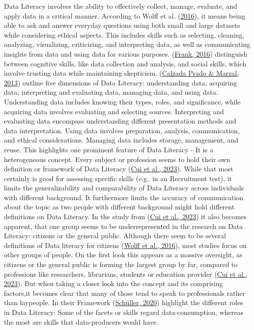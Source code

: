 \documentclass[
  12pt,
  a4paper,
  twoside]{article}
\begin{document}
Data Literacy involves the ability to effectively collect, manage, evaluate, and apply data in a critical manner. According to Wolff et al. (\protect\hyperlink{ref-wolff2016}{2016}), it means being able to ask and answer everyday questions using both small and large datasets while considering ethical aspects. This includes skills such as selecting, cleaning, analyzing, visualizing, criticizing, and interpreting data, as well as communicating insights from data and using data for various purposes. (\protect\hyperlink{ref-frank2016}{Frank, 2016}) distinguish between cognitive skills, like data collection and analysis, and social skills, which involve trusting data while maintaining skepticism. (\protect\hyperlink{ref-prado2013}{Calzada Prado \& Marzal, 2013}) outline five dimensions of Data Literacy: understanding data, acquiring data, interpreting and evaluating data, managing data, and using data. Understanding data includes knowing their types, roles, and significance, while acquiring data involves evaluating and selecting sources. Interpreting and evaluating data encompass understanding different presentation methods and data interpretation. Using data involves preparation, analysis, communication, and ethical considerations. Managing data includes storage, management, and reuse.
This highlights one prominent feature of Data Literacy - It is a heterogeneous concept. Every subject or profession seems to hold their own definition or framework of Data Literacy (\protect\hyperlink{ref-Cui2023}{Cui et al., 2023}). While that most certainly is good for assessing specific skills (e.g.~in an Recruitment test), it limits the generalizability and comparability of Data Literacy across individuals with different background. It furthermore limits the accuracy of communication about the topic as two people with different background might hold different definitions on Data Literacy.
In the study from (\protect\hyperlink{ref-Cui2023}{Cui et al., 2023}) it also becomes apparent, that one group seems to be underrepresented in the research on Data Literacy: citizens or the general public.
Although there seem to be several definitions of Data literacy for citizens (\protect\hyperlink{ref-wolff2016}{Wolff et al., 2016}), most studies focus on other groups of people. On the first look this appears as a massive oversight, as citizens or the general public is forming the largest group by far, compared to professions like researchers, librarians, students or education provider (\protect\hyperlink{ref-Cui2023}{Cui et al., 2023}). But when taking a closer look into the concept and its comprising factors,it becomes clear that many of those tend to speak to professionals rather than laypeople. In their Framework (\protect\hyperlink{ref-schuxfcller2020}{Schüller, 2020}) highlight the different roles in Data Literacy: Some of the facets or skills regard data-consumption, whereas the most are skills that data-producers would have.
\end{document}
